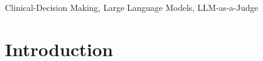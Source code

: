 \documentclass[conference, anonymous]{IEEEtran}
\begin{document}
\begin{abstract}


\end{abstract}

\begin{IEEEkeywords}
Clinical-Decision Making, Large Language Models, LLM-as-a-Judge
\end{IEEEkeywords}

\section{Introduction}
\label{sec:introduction}





\end{document}
